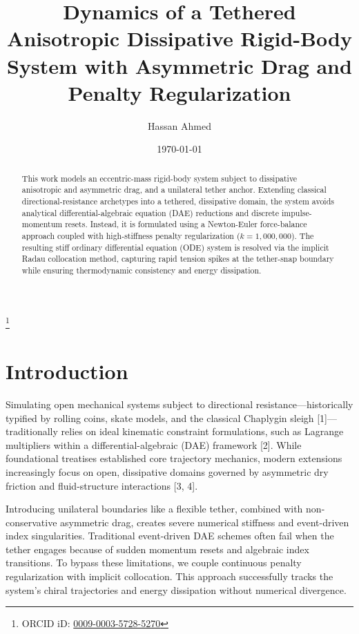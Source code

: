 \documentclass[11pt,aip,reprint,superscriptaddress]{revtex4-2}
\begin{document}
\title{Dynamics of a Tethered Anisotropic Dissipative Rigid-Body System with Asymmetric Drag and Penalty Regularization}
\author{Hassan Ahmed}
\thanks{ORCID iD: \href{https://orcid.org/0009-0003-5728-5270}{0009-0003-5728-5270}}
\date{\today}

\begin{abstract}
This work models an eccentric-mass rigid-body system subject to dissipative anisotropic and asymmetric drag, and a unilateral tether anchor. Extending classical directional-resistance archetypes into a tethered, dissipative domain, the system avoids analytical differential-algebraic equation (DAE) reductions and discrete impulse-momentum resets. Instead, it is formulated using a Newton-Euler force-balance approach coupled with high-stiffness penalty regularization (\(k = 1,000,000\)). The resulting stiff ordinary differential equation (ODE) system is resolved via the implicit Radau collocation method, capturing rapid tension spikes at the tether-snap boundary while ensuring thermodynamic consistency and energy dissipation.
\end{abstract}

\maketitle

\section{Introduction}
Simulating open mechanical systems subject to directional resistance—historically typified by rolling coins, skate models, and the classical Chaplygin sleigh [1]—traditionally relies on ideal kinematic constraint formulations, such as Lagrange multipliers within a differential-algebraic (DAE) framework [2]. While foundational treatises established core trajectory mechanics, modern extensions increasingly focus on open, dissipative domains governed by asymmetric dry friction and fluid-structure interactions [3, 4].

Introducing unilateral boundaries like a flexible tether, combined with non-conservative asymmetric drag, creates severe numerical stiffness and event-driven index singularities. Traditional event-driven DAE schemes often fail when the tether engages because of sudden momentum resets and algebraic index transitions. To bypass these limitations, we couple continuous penalty regularization with implicit collocation. This approach successfully tracks the system's chiral trajectories and energy dissipation without numerical divergence.
\end{document}
